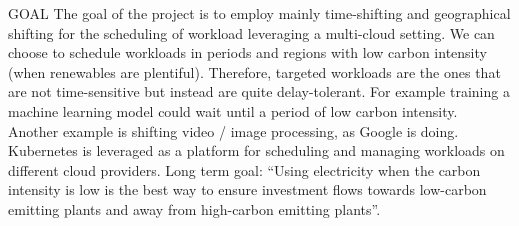 GOAL
The goal of the project is to employ mainly time-shifting and geographical shifting for the scheduling of workload leveraging a multi-cloud setting.
We can choose to schedule workloads in periods and regions with low carbon intensity (when renewables are plentiful). 
Therefore, targeted workloads are the ones that are not time-sensitive but instead are quite delay-tolerant. For example training a machine learning model could wait until a period of low carbon intensity. Another example is shifting video / image processing, as Google is doing.
Kubernetes is leveraged as a platform for scheduling and managing workloads on different cloud providers.
Long term goal: “Using electricity when the carbon intensity is low is the best way to ensure investment flows towards low-carbon emitting plants and away from high-carbon emitting plants”.

\newpage